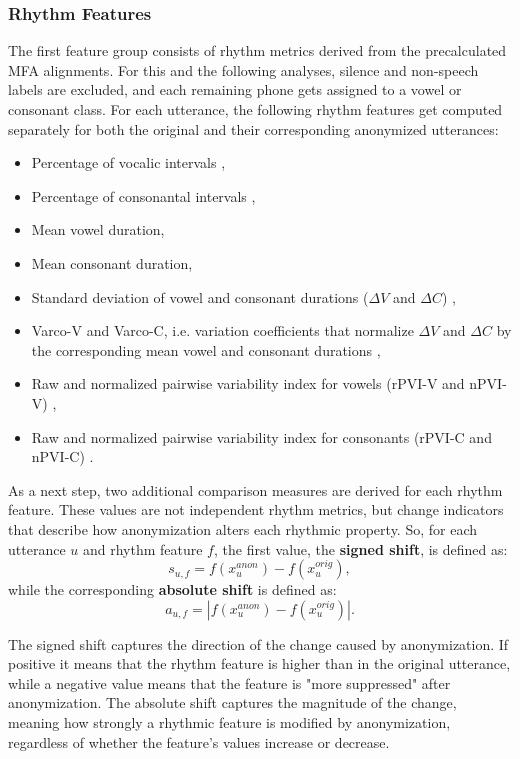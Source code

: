 \documentclass[12pt,leqno,a4paper]{article}
\begin{document}
\subsubsection{Rhythm Features}
The first feature group consists of rhythm metrics derived from the precalculated MFA alignments. For this and the following analyses, silence and non-speech labels are excluded, and each remaining phone gets assigned to a vowel or consonant class. For each utterance, the following rhythm features get computed separately for both the original and their corresponding anonymized utterances: 
\begin{itemize}
    \item Percentage of vocalic intervals \citep{ramus_correlates_1999},
    \item Percentage of consonantal intervals \citep{ramus_correlates_1999},
    \item Mean vowel duration,
    \item Mean consonant duration,
    \item Standard deviation of vowel and consonant durations ($\Delta V$ and $\Delta C$) \citep{ramus_correlates_1999},
    \item Varco-V and Varco-C, i.e. variation coefficients that normalize $\Delta V$ and $\Delta C$ by the corresponding mean vowel and consonant durations \citep{dellwo_rhythm_nodate},
    \item Raw and normalized pairwise variability index for vowels (rPVI-V and nPVI-V) \citep{ling_q_2000},
    \item Raw and normalized pairwise variability index for consonants (rPVI-C and nPVI-C) \citep{ling_q_2000}.
\end{itemize}

As a next step, two additional comparison measures are derived for each rhythm feature. These values are not independent rhythm metrics, but change indicators that describe how anonymization alters each rhythmic property. 
So, for each utterance $u$ and rhythm feature $f$, the first value, the \textbf{signed shift}, is defined as:
\begin{equation}
s_{u,f} = f(x_u^{anon}) - f(x_u^{orig}),
\end{equation}
while the corresponding \textbf{absolute shift} is defined as:
\begin{equation}
a_{u,f} = \left| f(x_u^{anon}) - f(x_u^{orig}) \right|.
\end{equation}

The signed shift captures the direction of the change caused by anonymization. If positive it means that the rhythm feature is higher than in the original utterance, while a negative value means that the feature is "more suppressed" after anonymization. 
The absolute shift captures the magnitude of the change, meaning how strongly a rhythmic feature is modified by anonymization, regardless of whether the feature's values increase or decrease.
\end{document}
